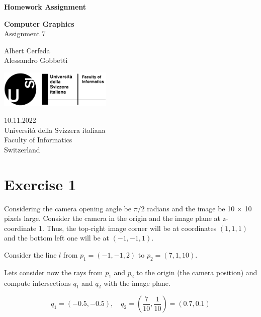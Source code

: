 \documentclass[tikz,14pt,fleqn]{article}
\newcommand\namesurname{Albert Cerfeda\\Alessandro Gobbetti}
\newcommand\assignment{Assignment 7}
\newcommand\subject{Computer Graphics}
\newcommand\documentdate{10.11.2022}
\begin{document}
\begin{titlepage}
   \begin{center}
       \vspace*{1cm}

       \textbf{\Large{Homework Assignment}}

       \vspace{0.5cm}
        \textbf{\subject}\\[5mm]
       \assignment
        
            
       \vspace{1.8cm}

        \namesurname
       \tableofcontents

       \vspace*{\fill}
     
        \includegraphics[width=0.4\textwidth]{fig/logo.png}
       
        \documentdate \\
        Università della Svizzera italiana\\
        Faculty of Informatics\\
        Switzerland\\

   \end{center}
\end{titlepage}



\section{Exercise 1}
Considering the camera opening angle be $\pi/2$ radians and the image be 10 × 10 pixels large. Consider the camera in the origin and the image plane at z-coordinate 1.
Thus, the top-right image corner will be at coordinates $(1,1,1)$ and the bottom left one will be at $(-1,-1,1)$. 


Consider the line $l$ from $p_1 = (-1, -1, 2)$ to $p_2 = (7, 1, 10)$.

Lets consider now the rays from $p_1$ and $p_2$ to the origin (the camera position) and compute intersections $q_1$ and $q_2$ with the image plane.



\[
q_1 = (-0.5, -0.5), \quad q_2 = (\frac{7}{10}, \frac{1}{10})=(0.7,0.1)
\]
\end{document}
